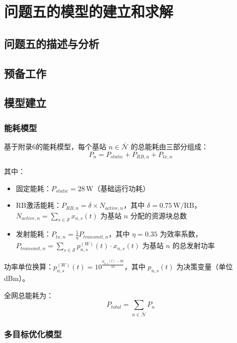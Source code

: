 \section{问题五的模型的建立和求解}
\subsection{问题五的描述与分析}

\subsection{预备工作}

\subsection{模型建立}

\subsubsection{能耗模型}

基于附录6的能耗模型，每个基站 $n \in \bar{\mathcal{N}}$ 的总能耗由三部分组成：
\begin{equation}
P_n = P_{static} + P_{RB,n} + P_{tx,n}
\end{equation}

其中：
\begin{itemize}
  \item 固定能耗：$P_{static} = 28\,\mathrm{W}$（基础运行功耗）
  \item RB激活能耗：$P_{RB,n} = \delta \times N_{active,n}$，其中 $\delta = 0.75\,\mathrm{W/RB}$，$N_{active,n} = \sum_{s\in\mathcal{S}} x_{n,s}(t)$ 为基站 $n$ 分配的资源块总数
  \item 发射能耗：$P_{tx,n} = \frac{1}{\eta} P_{transmit,n}$，其中 $\eta = 0.35$ 为效率系数，$P_{transmit,n} = \sum_{s\in\mathcal{S}} p_{n,s}^{(W)}(t) \cdot x_{n,s}(t)$ 为基站 $n$ 的总发射功率
\end{itemize}

功率单位换算：$p_{n,s}^{(W)}(t) = 10^{\frac{p_{n,s}(t)-30}{10}}$，其中 $p_{n,s}(t)$ 为决策变量（单位 dBm）。

全网总能耗为：
\begin{equation}
P_{total} = \sum_{n\in\bar{\mathcal{N}}} P_n
\end{equation}

\subsubsection{多目标优化模型}

